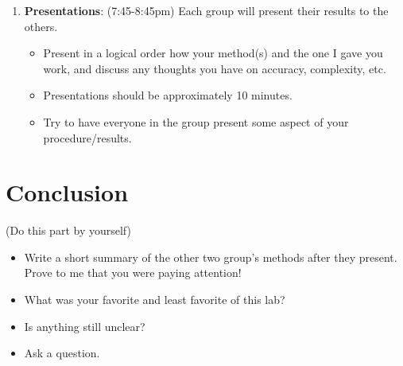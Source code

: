 \documentclass[12pt]{article}%
\begin{document}
\begin{enumerate}
    \item \textbf{Presentations}: (7:45-8:45pm) Each group will present their results to the others. 
    \begin{itemize}
        \item Present in a logical order how your method(s) and the one I gave you work, and discuss any thoughts you have on accuracy, complexity, etc.
        \item Presentations should be approximately 10 minutes. 
        \item Try to have everyone in the group present some aspect of your procedure/results.
    \end{itemize} 
\end{enumerate}

\section{Conclusion}
(Do this part by yourself)\\
\begin{itemize}
    \item Write a short summary of the other two group's methods after they present.  Prove to me that you were paying attention!
    \item What was your favorite and least favorite of this lab?
    \item Is anything still unclear?
    \item Ask a question. 
\end{itemize}
\end{document}
